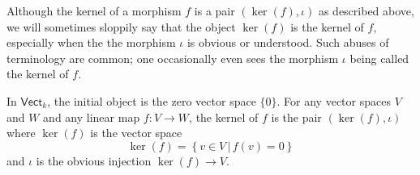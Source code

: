 \documentclass[notes.tex]{subfiles}
\begin{document}
\begin{note}
  Although the kernel of a morphism $f$ is a pair $(\ker(f), \iota)$ as described above, we will sometimes sloppily say that the object $\ker(f)$ is the kernel of $f$, especially when the the morphism $\iota$ is obvious or understood. Such abuses of terminology are common; one occasionally even sees the morphism $\iota$ being called the kernel of $f$.
\end{note}

\begin{example}
  In $\mathsf{Vect}_{k}$, the initial object is the zero vector space $\{0\}$. For any vector spaces $V$ and $W$ and any linear map $f\colon V \to W$, the kernel of $f$ is the pair $(\ker(f), \iota)$ where $\ker(f)$ is the vector space
  \begin{equation*}
    \ker(f) = \left\{ v \in V \,\big|\, f(v) = 0 \right\}
  \end{equation*}
  and $\iota$ is the obvious injection $\ker(f) \to V$.
\end{example}
\end{document}
